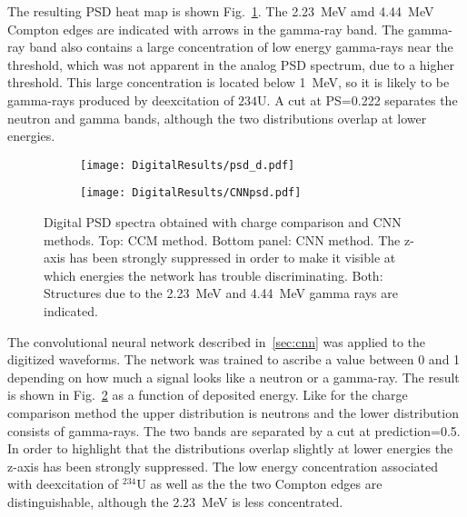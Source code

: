 \documentclass[main.tex]{subfiles}
\begin{document}
The resulting PSD heat map is shown Fig.~\ref{fig:psd_d}. The \SI{2.23}{\MeV} amd \SI{4.44}{MeV} Compton edges are indicated with arrows in the gamma-ray band. The gamma-ray band also contains a large concentration of low energy gamma-rays near the threshold, which was not apparent in the analog PSD spectrum, due to a higher threshold. This large concentration is located below \SI{1}{MeV}, so it is likely to be gamma-rays produced by deexcitation of $\text{234}$U.
A cut at PS=0.222 separates the neutron and gamma bands, although the two distributions overlap at lower energies.

\begin{figure}
    \centering
    \begin{subfigure}[ht]{\textwidth}
    	\centering
        \texttt{[image: DigitalResults/psd\_d.pdf]}
        \caption{}
        \label{fig:psd_d}
    \end{subfigure}
	\begin{subfigure}[ht]{\textwidth}
		\centering
        \texttt{[image: DigitalResults/CNNpsd.pdf]}
        \caption{}
    	\label{fig:cnn_E} 
    \end{subfigure}
        \caption[Digital PSD spectra obtained with charge comparison and CNN methods.]{Digital PSD spectra obtained with charge comparison and CNN methods. Top: CCM method. Bottom panel: CNN method. The z-axis has been strongly suppressed in order to make it visible at which energies the network has trouble discriminating. Both: Structures due to the \SI{2.23}{MeV} and \SI{4.44}{MeV} gamma rays are indicated.}
    \label{fig:ccm_cnn}
\end{figure}

The convolutional neural network described in~\ref{sec:cnn} was applied to the digitized waveforms. The network was trained to ascribe a value between 0 and 1 depending on how much a signal looks like a neutron or a gamma-ray. The result is shown in Fig.~\ref{fig:cnn_E} as a function of deposited energy. Like for the charge comparison method the upper distribution is neutrons and the lower distribution consists of gamma-rays. The two bands are separated by a cut at prediction=0.5. In order to highlight that the distributions overlap slightly at lower energies the z-axis has been strongly suppressed. The low energy concentration associated with deexcitation of $^\text{234}$U as well as the the two Compton edges are distinguishable, although the \SI{2.23}{\MeV} is less concentrated.
\end{document}
